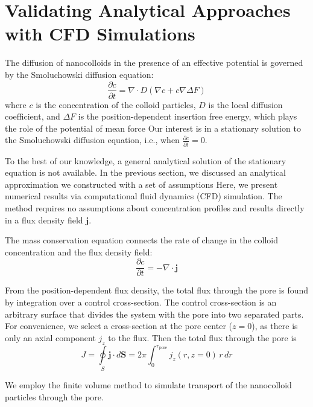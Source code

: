 \documentclass[10pt, a4paper]{article}
\begin{document}
\section{Validating Analytical Approaches with CFD Simulations}

\begin{multicols}{2}
The diffusion of nanocolloids in the presence of an effective potential is governed by the Smoluchowski diffusion equation:
\begin{equation}
    \label{eq:Smoluchowski}
    \frac{\partial c}{\partial t} = \nabla \cdot D(\nabla c + c \nabla \Delta F)
\end{equation}
where $c$ is the concentration of the colloid particles, $D$ is the local diffusion coefficient, and $\Delta F$ is the position-dependent insertion free energy, which plays the role of the potential of mean force
Our interest is in a stationary solution to the Smoluchowski diffusion equation, i.e., when $\frac{\partial c}{\partial t} = 0$.

To the best of our knowledge, a general analytical solution of the stationary equation is not available.
In the previous section, we discussed an analytical approximation we constructed with a set of assumptions
Here, we present numerical results via computational fluid dynamics (CFD) simulation.
The method requires no assumptions about concentration profiles and results directly in a flux density field $\mathbf{j}$.

The mass conservation equation connects the rate of change in the colloid concentration and the flux density field:
\begin{equation}
    \frac{\partial c}{\partial t} = -\nabla \cdot \mathbf{j}
\end{equation}

From the position-dependent flux density, the total flux through the pore is found by integration over a control cross-section.
The control cross-section is an arbitrary surface that divides the system with the pore into two separated parts.
For convenience, we select a cross-section at the pore center ($z = 0$), as there is only an axial component $j_z$ to the flux.
Then the total flux through the pore is
\begin{equation}
    \label{eq:total_flux_1}
    J = \oint\limits_{S} \mathbf{j} \cdot d\mathbf{S} = 2 \pi \int_0^{r_\textrm{pore}} j_z(r, z = 0) \, r \, dr
\end{equation}

We employ the finite volume method to simulate transport of the nanocolloid particles through the pore.


\end{multicols}
\end{document}
